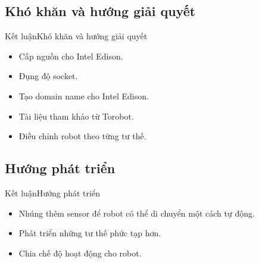 \documentclass[compress, blue, 13pt,hyperref={pdfpagemode=FullScreen}]{beamer}
\begin{document}
\subsection{Khó khăn và hướng giải quyết}
\begin{frame}{Kết luận}{Khó khăn và hướng giải quyết}
\transblindshorizontal
\begin{itemize}
\pause
\item Cấp nguồn cho Intel Edison.
\pause
\item Đụng độ socket.
\pause
\item Tạo domain name cho Intel Edison.
\pause
\item Tài liệu tham khảo từ Torobot.
\pause
\item Điều chỉnh robot theo từng tư thế.
\end{itemize}
\end{frame}
\subsection{Hướng phát triển}
\begin{frame}{Kết luận}{Hướng phát triển}
\transblindshorizontal
\begin{itemize}
\pause
\item Nhúng thêm sensor để robot có thể di chuyển một cách tự động.
\pause
\item Phát triển những tư thế phức tạp hơn.
\pause 
\item Chia chế độ hoạt động cho robot.
\end{itemize}
\end{frame}
\section*{}
\begin{frame}
\transdissolve
\begin{center}
\begin{Huge}
\color{blue}{Cảm ơn các thầy/cô đã lắng nghe}
\end{Huge}
\end{center}
\end{frame}
\end{document}

